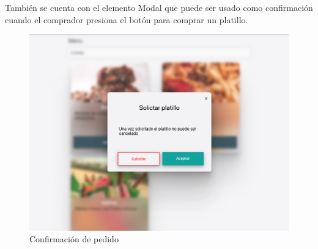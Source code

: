 También se cuenta con el elemento Modal que puede ser usado como confirmación cuando el comprador presiona el botón para comprar un platillo.
\newline
\begin{figure}[H]
    \includegraphics[width=1\textwidth]{./Imagenes/9.15.png}
   \centering 
    \caption[Confirmación de pedido]{Confirmación de pedido}
    \end{figure}
\newline

